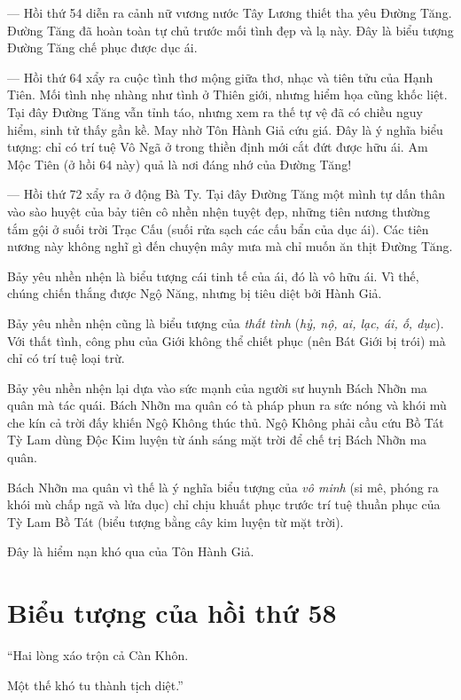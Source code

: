 — Hồi thứ 54 diễn ra cảnh nữ vương nước Tây Lương thiết tha yêu Đường Tăng. Đường Tăng đã hoàn toàn tự chủ trước mối tình đẹp và lạ này. Đây là biểu tượng Đường Tăng chế phục được dục ái.

— Hồi thứ 64 xẩy ra cuộc tình thơ mộng giữa thơ, nhạc và tiên tửu của Hạnh Tiên. Mối tình nhẹ nhàng như tình ở Thiên giới, nhưng hiểm họa cũng khốc liệt. Tại đây Đường Tăng vẫn tỉnh táo, nhưng xem ra thế tự vệ đã có chiều nguy hiểm, sinh tử thấy gần kề. May nhờ Tôn Hành Giả cứu giá. Đây là ý nghĩa biểu tượng: chỉ có trí tuệ Vô Ngã ở trong thiền định mới cắt đứt được hữu ái. Am Mộc Tiên (ở hồi 64 này) quả là nơi đáng nhớ của Đường Tăng!

— Hồi thứ 72 xẩy ra ở động Bà Ty. Tại đây Đường Tăng một mình tự dấn thân vào sào huyệt của bảy tiên cô nhền nhện tuyệt đẹp, những tiên nương thường tắm gội ở suối trời Trạc Cấu (suối rửa sạch các cấu bẩn của dục ái). Các tiên nương này không nghĩ gì đến chuyện mây mưa mà chỉ muốn ăn thịt Đường Tăng.

Bảy yêu nhền nhện là biểu tượng cái tinh tế của ái, đó là vô hữu ái. Vì thế, chúng chiến thắng được Ngộ Năng, nhưng bị tiêu diệt bởi Hành Giả.

Bảy yêu nhền nhện cũng là biểu tượng của \emph{thất tình} (\emph{hỷ, nộ, ai, lạc, ái, ố, dục}). Với thất tình, công phu của Giới không thể chiết phục (nên Bát Giới bị trói) mà chỉ có trí tuệ loại trừ.

Bảy yêu nhền nhện lại dựa vào sức mạnh của người sư huynh Bách Nhỡn ma quân mà tác quái. Bách Nhỡn ma quân có tà pháp phun ra sức nóng và khói mù che kín cả trời đấy khiến Ngộ Không thúc thủ. Ngộ Không phải cầu cứu Bồ Tát Tỳ Lam dùng Độc Kim luyện từ ánh sáng mặt trời để chế trị Bách Nhỡn ma quân.

Bách Nhỡn ma quân vì thế là ý nghĩa biểu tượng của \emph{vô minh} (si mê, phóng ra khói mù chấp ngã và lửa dục) chỉ chịu khuất phục trước trí tuệ thuần phục của Tỳ Lam Bồ Tát (biểu tượng bằng cây kim luyện từ mặt trời).

Đây là hiểm nạn khó qua của Tôn Hành Giả.

\section{Biểu tượng của hồi thứ 58} %
\label{sec:bieu_tuong_hoi_58}

\begin{itshape}
``Hai lòng xáo trộn cả Càn Khôn.

Một thế khó tu thành tịch diệt.''
\end{itshape}

